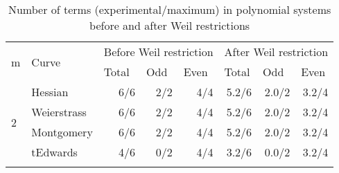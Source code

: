 
\begin{table}[!h]
\centering
\caption{Number of terms (experimental/maximum) in polynomial systems before and after Weil restrictions}
\label{tb:terms}
\begin{tabular}{llrrrrrr}
\hline
\multicolumn{1}{|l|}{\multirow{2}{*}{m}} & \multicolumn{1}{l|}{\multirow{2}{*}{Curve}} & \multicolumn{3}{l|}{Before Weil restriction}                                                    & \multicolumn{3}{l|}{After Weil restriction}                                                            \\ \cline{3-8} 
\multicolumn{1}{|l|}{}                   & \multicolumn{1}{l|}{}                       & \multicolumn{1}{l|}{Total}   & \multicolumn{1}{l|}{Odd}     & \multicolumn{1}{l|}{Even}    & \multicolumn{1}{l|}{Total}     & \multicolumn{1}{l|}{Odd}       & \multicolumn{1}{l|}{Even}      \\ \hline \hline
\multicolumn{1}{|l|}{\multirow{4}{*}{2}} & \multicolumn{1}{l|}{Hessian}                & \multicolumn{1}{r|}{6/6}     & \multicolumn{1}{r|}{2/2}     & \multicolumn{1}{r|}{4/4}     & \multicolumn{1}{r|}{5.2/6}     & \multicolumn{1}{r|}{2.0/2}     & \multicolumn{1}{r|}{3.2/4}     \\ \cline{2-8} 
\multicolumn{1}{|l|}{}                   & \multicolumn{1}{l|}{Weierstrass}            & \multicolumn{1}{r|}{6/6}     & \multicolumn{1}{r|}{2/2}     & \multicolumn{1}{r|}{4/4}     & \multicolumn{1}{r|}{5.2/6}     & \multicolumn{1}{r|}{2.0/2}     & \multicolumn{1}{r|}{3.2/4}     \\ \cline{2-8} 
\multicolumn{1}{|l|}{}                   & \multicolumn{1}{l|}{Montgomery}             & \multicolumn{1}{r|}{6/6}     & \multicolumn{1}{r|}{2/2}     & \multicolumn{1}{r|}{4/4}     & \multicolumn{1}{r|}{5.2/6}     & \multicolumn{1}{r|}{2.0/2}     & \multicolumn{1}{r|}{3.2/4}     \\ \cline{2-8} 
\multicolumn{1}{|l|}{}                   & \multicolumn{1}{l|}{tEdwards}               & \multicolumn{1}{r|}{4/6}     & \multicolumn{1}{r|}{0/2}     & \multicolumn{1}{r|}{4/4}     & \multicolumn{1}{r|}{3.2/6}     & \multicolumn{1}{r|}{0.0/2}     & \multicolumn{1}{r|}{3.2/4}     \\ \hline  \vspace{-3.2mm}
                                         &                                             &                              &                              &                              &                                &                                &                                \\ \hline

\end{tabular}
\end{table}
